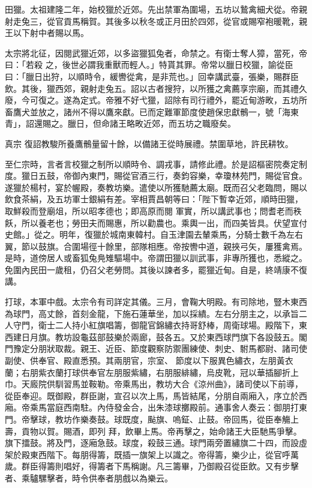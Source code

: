 \begin{pinyinscope}
 田獵。太祖建隆二年，始校獵於近郊。先出禁軍為圍場，五坊以鷙禽細犬從。帝親射走兔三，從官貢馬稱賀。其後多以秋冬或正月田於四郊，從官或賜窄袍暖靴，親王以下射中者賜以馬。



 太宗將北征，因閱武獵近郊，以多盜獵狐兔者，命禁之。有衛士奪人獐，當死，帝曰：「若殺
 之，後世必謂我重獸而輕人。」特貰其罪。帝常以臘日校獵，諭從臣曰：「臘日出狩，以順時令，緩轡從禽，是非荒也。」回幸講武臺，張樂，賜群臣飲。其後，獵西郊，親射走兔五。詔以古者搜狩，以所獲之禽薦享宗廟，而其禮久廢，今可復之。遂為定式。帝雅不好弋獵，詔除有司行禮外，罷近甸游畋，五坊所畜鷹犬並放之，諸州不得以鷹來獻。已而定難軍節度使趙保忠獻鶻一，號「海東青」，詔還賜之。臘日，但命諸王略畋近郊，而五坊之職廢矣。



 真宗
 復詔教駿所養鷹鶻量留十餘，以備諸王從時展禮。禁圍草地，許民耕牧。



 至仁宗時，言者言校獵之制所以順時令、調戎事，請修此禮。於是詔樞密院奏定制度。獵日五鼓，帝御內東門，賜從官酒三行，奏鈞容樂，幸瓊林苑門，賜從官食。遂獵於楊村，宴於幄殿，奏教坊樂。遣使以所獲馳薦太廟。既而召父老臨問，賜以飲食茶絹，及五坊軍士銀絹有差。宰相賈昌朝等曰：「陛下暫幸近郊，順時田獵，取鮮殺而登廟俎，所以昭孝德也；即高原而閱
 軍實，所以講武事也；問耆老而秩飫，所以養老也；勞田夫而賜惠，所以勸農也。乘輿一出，而四美皆具。伏望宣付史館。」從之。明年，復獵於城南東韓村。自玉津園去輦乘馬，分騎士數千為左右翼，節以鼓旗。合圍場徑十餘里，部隊相應。帝按轡中道，親挾弓矢，屢獲禽焉。是時，道傍居人或畜狐兔鳧雉驅場中。帝謂田獵以訓武事，非專所獲也，悉縱之。免圍內民田一歲租，仍召父老勞問。其後以諫者多，罷獵近甸。自是，終靖康不復講。



 打球，本軍中戲。太宗令有司詳定其儀。三月，會鞠大明殿。有司除地，豎木東西為球門，高丈餘，首刻金龍，下施石蓮華坐，加以採繢。左右分朋主之，以承旨二人守門，衛士二人持小紅旗唱籌，御龍官錦繡衣持哥舒棒，周衛球場。殿階下，東西建日月旗。教坊設龜茲部鼓樂於兩廊，鼓各五。又於東西球門旗下各設鼓五。閣門豫定分朋狀取裁。親王、近臣、節度觀察防禦團練使、刺史、駙馬都尉、諸司使副使、供奉官、殿直悉預。其兩朋官，宗室、
 節度以下服異色繡衣，左朋黃衣蘭；右朋紫衣蘭打球供奉官左朋服紫繡，右朋服緋繡，烏皮靴，冠以華插腳折上巾。天廄院供馴習馬並鞍勒。帝乘馬出，教坊大合《涼州曲》，諸司使以下前導，從臣奉迎。既御殿，群臣謝，宣召以次上馬，馬皆結尾，分朋自兩廂入，序立於西廂。帝乘馬當庭西南駐。內侍發金合，出朱漆球擲殿前。通事舍人奏云：御朋打東門。帝擊球，教坊作樂奏鼓。球既度，颭旗、嗚鉦、止鼓。帝回馬，從臣奉觴上壽，貢物以賀。賜酒，即列
 拜，飲畢上馬。帝再擊之，始命諸王大臣馳馬爭擊。旗下擂鼓。將及門，逐廂急鼓。球度，殺鼓三通。球門兩旁置繡旗二十四，而設虛架於殿東西階下。每朋得籌，既插一旗架上以識之。帝得籌，樂少止，從官呼萬歲。群臣得籌則唱好，得籌者下馬稱謝。凡三籌畢，乃御殿召從臣飲。又有步擊者、乘驢騾擊者，時令供奉者朋戲以為樂云。




\end{pinyinscope}
